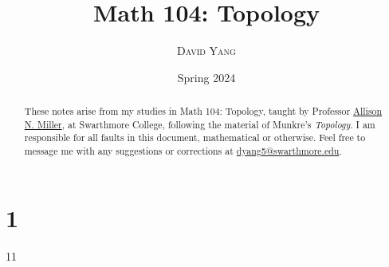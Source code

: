 \documentclass[11pt]{article}
\begin{document}
\title{\LARGE \textbf{Math 104: Topology}}
\date{Spring 2024}
\author{\textsc{David Yang}}

\maketitle

\begin{abstract}
These notes arise from my studies in Math 104: Topology, taught by 
Professor \href{https://sites.google.com/view/anmiller/}{Allison N. Miller}, at Swarthmore College, following the material of Munkre's \textit{Topology}.
I am responsible for all faults in this document, mathematical or otherwise.
Feel free to message me with any suggestions or corrections at \href{mailto:dyang5@swarthmore.edu}{dyang5@swarthmore.edu}.
\end{abstract}

\tableofcontents

\chapter{1}{11}
\end{document}

